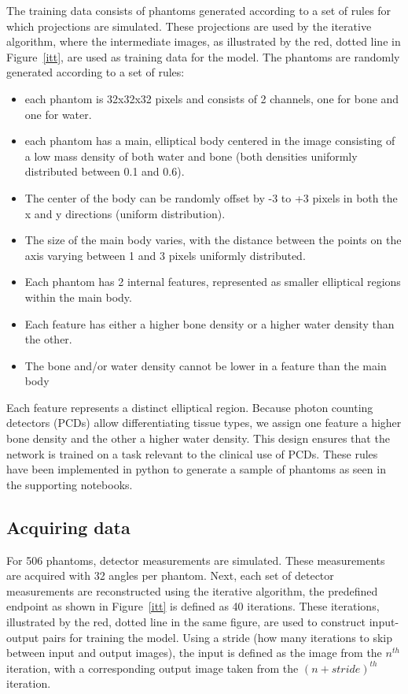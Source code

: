 \documentclass{article}
\begin{document}
The training data consists of phantoms generated according to a set of rules for which projections are simulated. These projections are used by the iterative algorithm, where the intermediate images, as illustrated by the red, dotted line in Figure~\ref{itt}, are used as training data for the model. The phantoms are randomly generated according to a set of rules:

\begin{itemize}
\item each phantom is 32x32x32 pixels and consists of 2 channels, one for bone and one for water.
\item each phantom has a main, elliptical body centered in the image consisting of a low mass density of both water and bone (both densities uniformly distributed between 0.1 and 0.6).
\item The center of the body can be randomly offset by -3 to +3 pixels in both the x and y directions (uniform distribution).
\item The size of the main body varies, with the distance between the points on the axis varying between 1 and 3 pixels uniformly distributed.
\item Each phantom has 2 internal features, represented as smaller elliptical regions within the main body.
\item Each feature has either a higher bone density or a higher water density than the other.
\item The bone and/or water density cannot be lower in a feature than the main body
\end{itemize}

Each feature represents a distinct elliptical region. Because photon counting detectors (PCDs) allow differentiating tissue types, we assign one feature a higher bone density and the other a higher water density. This design ensures that the network is trained on a task relevant to the clinical use of PCDs. These rules have been implemented in python to generate a sample of phantoms as seen in the supporting notebooks.

\subsection{Acquiring data}

For 506 phantoms, detector measurements are simulated. These measurements are acquired with 32 angles per phantom. Next, each set of detector measurements are reconstructed using the iterative algorithm, the predefined endpoint as shown in Figure~\ref{itt} is defined as 40 iterations. These iterations, illustrated by the red, dotted line in the same figure, are used to construct input-output pairs for training the model. Using a stride (how many iterations to skip between input and output images), the input is defined as the image from the $n^{th}$ iteration, with a corresponding output image taken from the $(n+stride)^{th}$ iteration.
\end{document}
